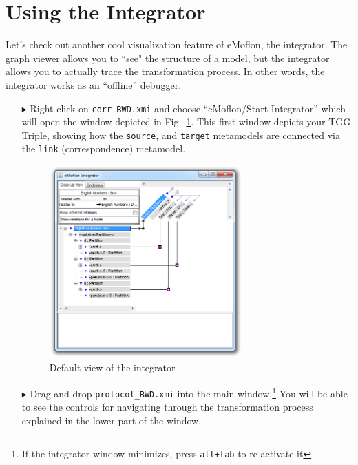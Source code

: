 \newpage
\hypertarget{sec:app_integrator}{}
\section{Using the Integrator}
\genHeader

Let's check out another cool visualization feature of eMoflon, the integrator. The graph viewer allows you to ``see" the structure of a model, but the
integrator allows you to actually trace the transformation process. In other words, the integrator works as an ``offline'' debugger.

\begin{itemize}

\item[$\blacktriangleright$] Right-click on \texttt{corr\_BWD.xmi} and choose ``eMoflon/Start Integrator'' which will open the window depicted in
Fig.~\ref{eclipse:integrator_start}. This first window depicts your TGG Triple, showing how the \texttt{source}, and \texttt{target} metamodels are connected
via the \texttt{link} (correspondence) metamodel.

\begin{figure}[htbp]
\begin{center}
  \includegraphics[width=0.7\textwidth]{eclipse_integratorStart}
  \caption{Default view of the integrator}
  \label{eclipse:integrator_start}
\end{center}
\end{figure}

\item[$\blacktriangleright$] Drag and drop \texttt{protocol\_BWD.xmi} into the main window.\footnote{If the integrator window minimizes, press \texttt{alt+tab}
to re-activate it} You will be able to see the controls for navigating through the transformation process explained in the lower part of the window.


\end{itemize}
